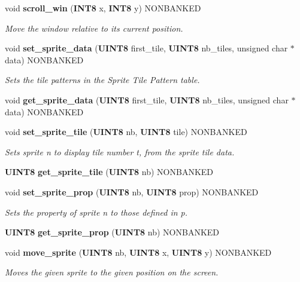 \begin{CompactItemize}
\item 
void {\bf scroll\_\-win} ({\bf INT8} x, {\bf INT8} y) NONBANKED
\begin{CompactList}\small\item\em Move the window relative to its current position.\item\end{CompactList}

\item 
void {\bf set\_\-sprite\_\-data} ({\bf UINT8} first\_\-tile, {\bf UINT8} nb\_\-tiles, unsigned char $\ast$data) NONBANKED
\begin{CompactList}\small\item\em Sets the tile patterns in the Sprite Tile Pattern table.\item\end{CompactList}

\item 
\label{gb.h_a89}
void {\bf get\_\-sprite\_\-data} ({\bf UINT8} first\_\-tile, {\bf UINT8} nb\_\-tiles, unsigned char $\ast$data) NONBANKED
\item 
void {\bf set\_\-sprite\_\-tile} ({\bf UINT8} nb, {\bf UINT8} tile) NONBANKED
\begin{CompactList}\small\item\em Sets sprite n to display tile number t, from the sprite tile data.\item\end{CompactList}

\item 
\label{gb.h_a91}
{\bf UINT8} {\bf get\_\-sprite\_\-tile} ({\bf UINT8} nb) NONBANKED
\item 
void {\bf set\_\-sprite\_\-prop} ({\bf UINT8} nb, {\bf UINT8} prop) NONBANKED
\begin{CompactList}\small\item\em Sets the property of sprite n to those defined in p.\item\end{CompactList}

\item 
\label{gb.h_a93}
{\bf UINT8} {\bf get\_\-sprite\_\-prop} ({\bf UINT8} nb) NONBANKED
\item 
void {\bf move\_\-sprite} ({\bf UINT8} nb, {\bf UINT8} x, {\bf UINT8} y) NONBANKED
\begin{CompactList}\small\item\em Moves the given sprite to the given position on the screen.\item\end{CompactList}


\end{CompactItemize}
